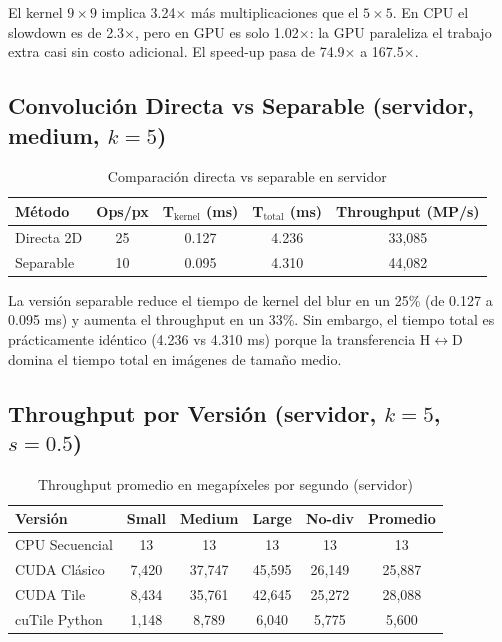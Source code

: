 \documentclass[12pt,a4paper]{article}
\begin{document}
El kernel $9\times9$ implica 3.24$\times$ m\'as multiplicaciones que el $5\times5$. En CPU el slowdown es de 2.3$\times$, pero en GPU es solo 1.02$\times$: la GPU paraleliza el trabajo extra casi sin costo adicional. El speed-up pasa de 74.9$\times$ a 167.5$\times$.

\subsection{Convoluci\'on Directa vs Separable (servidor, medium, $k=5$)}

\begin{table}[H]
\centering
\caption{Comparaci\'on directa vs separable en servidor}
\label{tab:separable}
\begin{tabular}{lcccc}
\toprule
\textbf{M\'etodo} & \textbf{Ops/px} & \textbf{T$_{\text{kernel}}$ (ms)} & \textbf{T$_{\text{total}}$ (ms)} & \textbf{Throughput (MP/s)} \\
\midrule
Directa 2D   & 25 & 0.127 & 4.236 & 33,085 \\
Separable    & 10 & 0.095 & 4.310 & 44,082 \\
\bottomrule
\end{tabular}
\end{table}

La versi\'on separable reduce el tiempo de kernel del blur en un 25\% (de 0.127 a 0.095 ms) y aumenta el throughput en un 33\%. Sin embargo, el tiempo total es pr\'acticamente id\'entico (4.236 vs 4.310 ms) porque la transferencia H$\leftrightarrow$D domina el tiempo total en im\'agenes de tama\~no medio.

\subsection{Throughput por Versi\'on (servidor, $k=5$, $s=0.5$)}

\begin{table}[H]
\centering
\caption{Throughput promedio en megap\'ixeles por segundo (servidor)}
\label{tab:throughput}
\begin{tabular}{lccccc}
\toprule
\textbf{Versi\'on} & \textbf{Small} & \textbf{Medium} & \textbf{Large} & \textbf{No-div} & \textbf{Promedio} \\
\midrule
CPU Secuencial  & 13 & 13 & 13 & 13 & 13 \\
CUDA Cl\'asico  & 7,420 & 37,747 & 45,595 & 26,149 & 25,887 \\
CUDA Tile       & 8,434 & 35,761 & 42,645 & 25,272 & 28,088 \\
cuTile Python   & 1,148 & 8,789  & 6,040  & 5,775  & 5,600 \\
\bottomrule
\end{tabular}
\end{table}
\end{document}
